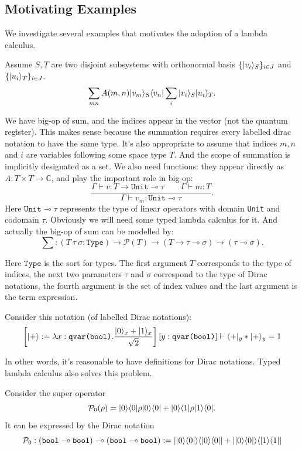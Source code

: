 \subsection{Motivating Examples}
We investigate several examples that motivates the adoption of a lambda calculus.

\begin{example}
  Assume $S, T$ are two disjoint subsystems with orthonormal basis $\{|v_i\rangle_S\}_{i \in J}$ and $\{|u_i\rangle_T\}_{i \in J}$.
  $$
  \sum_{mn}A(m, n) |v_m\rangle_S\langle v_n| \sum_i |v_i\rangle_S |u_i\rangle_T.
  $$
\end{example}
We have big-op of sum, and the indices appear in the vector (not the quantum register). This makes sense because the summation requires every labelled dirac notation to have the same type. It's also appropriate to assume that indices $m, n$ and $i$ are variables following some space type $T$. And the scope of summation is implicitly designated as a set. We also need functions: they appear directly as $A : T \times T \to \mathbb{C}$, and play the important role in big-op:
$$
\frac{\Gamma \vdash v : T \to \texttt{Unit} \multimap \tau \qquad \Gamma \vdash m : T}{\Gamma \vdash v_m : \texttt{Unit} \multimap \tau}.
$$
Here $\texttt{Unit} \multimap \tau$ represents the type of linear operators with domain \texttt{Unit} and codomain $\tau$. Obviously we will need some typed lambda calculus for it. And actually the big-op of sum can be modelled by:
$$
\sum : (T\ \tau\ \sigma : \texttt{Type}) \to \mathcal{P}(T) \to (T \to \tau \multimap \sigma) \to (\tau \multimap \sigma).
$$

Here $\texttt{Type}$ is the sort for types. The first argument $T$ corresponds to the type of indices, the next two parameters $\tau$ and $\sigma$ correspond to the type of Dirac notations, the fourth argument is the set of index values and the last argument is the term expression.

\begin{example}[definitions]
  Consider this notation (of labelled Dirac notations):
  $$
  \left [|+\rangle := \lambda x:\texttt{qvar(bool)}.\frac{|0\rangle_x + |1\rangle_x}{\sqrt{2}} \right ][y : \texttt{qvar(bool)}] \vdash \langle +|_y * |+\rangle_y = 1
  $$
\end{example}
In other words, it's reasonable to have definitions for Dirac notations. Typed lambda calculus also solves this problem.

\begin{example}
  Consider the super operator 
  $$
  \mathcal{P}_0 (\rho) = |0\rangle\langle 0| \rho |0\rangle\langle 0| + |0\rangle\langle 1| \rho |1\rangle\langle 0|.
  $$
  It can be expressed by the Dirac notation
  $$
  \mathcal{P}_0 : (\texttt{bool} \multimap \texttt{bool}) \multimap (\texttt{bool} \multimap \texttt{bool}) := ||0\rangle\langle 0|\rangle\langle |0\rangle\langle 0|| + ||0\rangle\langle 0|\rangle\langle |1\rangle\langle 1||
  $$
\end{example}


